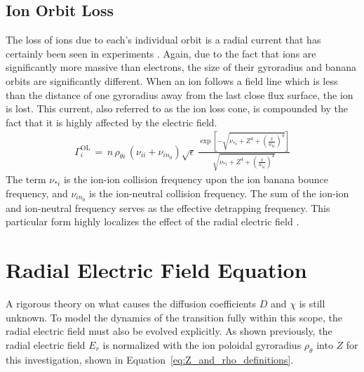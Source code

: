 \subsection{Ion Orbit Loss}\label{ssec:ol_loss}
The loss of ions due to each's individual orbit is a radial current that has certainly been seen in experiments \cite{weisen_boundary_1991}.
Again, due to the fact that ions are significantly more massive than electrons, the size of their gyroradius and banana orbits are significantly different.
When an ion follows a field line which is less than the distance of one gyroradius away from the last close flux surface, the ion is lost.
This current, also referred to as the ion loss cone, is compounded by the fact that it is highly affected by the electric field.
\begin{align} %
	\Gamma_i^\text{OL} \,=\, n \, \rho_{\theta i} \, (\nu_{ii} + \nu_{in_0})
		\sqrt{\epsilon} \, \frac{\exp\left[-\sqrt{\nu_{*i} + Z^4 +
		\left(\frac{x}{w_{bi}}\right)^4}\right]}{\sqrt{\nu_{*i} + Z^4 +
		\left(\frac{x}{w_{bi}}\right)^4}} \label{eq:Gamma_OL}
\end{align}
The term $\nu_{*i}$ is the ion-ion collision frequency upon the ion banana bounce frequency, and $\nu_{in_0}$ is the ion-neutral collision frequency.
The sum of the ion-ion and ion-neutral frequency serves as the effective detrapping frequency.
This particular form highly localizes the effect of the radial electric field \cite{kobayashi_experimental_2016}.

\section{Radial Electric Field Equation}\label{sec:Z_equation}
A rigorous theory on what causes the diffusion coefficients $D$ and $\chi$ is still unknown.
To model the dynamics of the transition fully within this scope, the radial electric field must also be evolved explicitly.
As shown previously, the radial electric field $E_r$ is normalized with the ion poloidal gyroradius $\rho_\theta$ into $Z$ for this investigation, shown in Equation~\ref{eq:Z_and_rho_definitions}.

